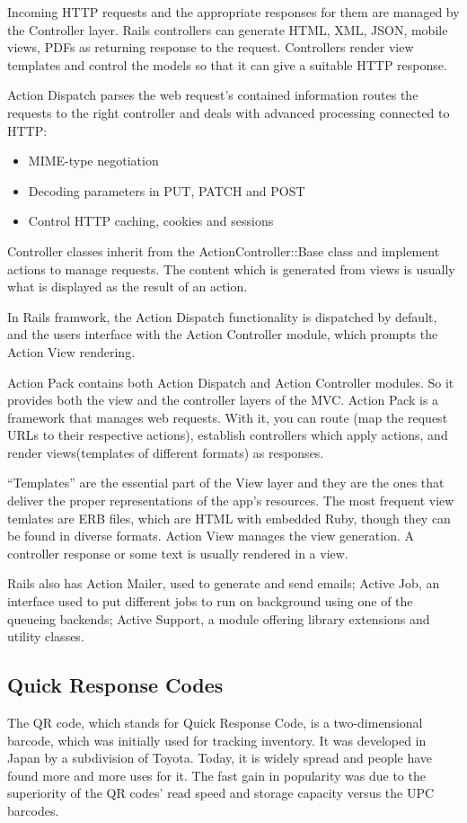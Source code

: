 Incoming HTTP requests and the appropriate responses for them are managed by the Controller layer.
Rails controllers can generate HTML, XML, JSON, mobile views, PDFs as returning response to the request. Controllers render view templates and control the models so that it can give a suitable HTTP response. 

Action Dispatch parses the web request's contained information routes the requests to the right controller and deals with advanced processing connected to HTTP:
\begin{itemize}
  \item MIME-type negotiation
  \item Decoding parameters in PUT, PATCH and POST
  \item Control HTTP caching, cookies and sessions
\end{itemize}

Controller classes inherit from the ActionController::Base class and implement actions to manage requests. The content which is generated from views is usually what is displayed as the result of an action. 

In Rails framwork, the Action Dispatch functionality is dispatched by default, and the users interface with the Action Controller module, which prompts the Action View rendering. 

Action Pack contains both Action Dispatch and Action Controller modules. So it provides both the view and the controller layers of the MVC. Action Pack is a framework that manages web requests. With it, you can route (map the request URLs to their respective actions), establish controllers which apply actions, and render views(templates of different formats) as responses.


``Templates'' are the essential part of the View layer and they are the ones that deliver the  proper representations of the app's resources. The most frequent view temlates are ERB files, which are HTML with embedded Ruby, though they can be found in diverse formats. Action View manages the view generation. A controller response or some text is usually rendered in a view.
 
Rails also has Action Mailer, used to generate and send emails; Active Job, an interface used to put different jobs to run on background using one of the queueing backends; Active Support, a module offering library extensions and utility classes.

\subsection{Quick Response Codes}
The QR code, which stands for Quick Response Code, is a two-dimensional barcode, which was initially used for tracking inventory. It was developed in Japan by a subdivision of Toyota. Today, it is widely spread and people have found more and more uses for it. The fast gain in popularity was due to the superiority of the QR codes’ read speed and storage capacity versus the UPC barcodes.


